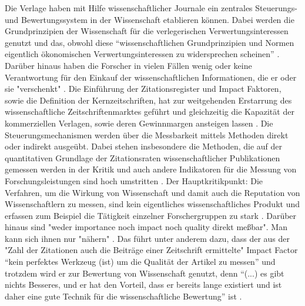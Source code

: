 Die Verlage haben mit Hilfe wissenschaftlicher Journale ein zentrales Steuerungs- und Bewertungssystem in der Wissenschaft etablieren können. Dabei werden die Grundprinzipien der Wissenschaft für die verlegerischen Verwertungsinteressen genutzt und das, obwohl diese “wissenschaftlichen Grundprinzipien und Normen eigentlich ökonomischen Verwertungsinteressen zu widersprechen scheinen” \cite{hanekop_2006}. Darüber hinaus haben die Forscher in vielen Fällen wenig oder keine Verantwortung für den Einkauf der wissenschaftlichen Informationen, die er oder sie "verschenkt" \cite{steele_2006}. Die Einführung der Zitationsregister und Impact Faktoren, sowie die Definition der Kernzeitschriften, hat zur weitgehenden Erstarrung des wissenschaftliche Zeitschriftenmarktes geführt und gleichzeitig die Kapazität der kommerziellen Verlagen, sowie deren Gewinnmargen ansteigen lassen \cite{CREATe_2014}. Die Steuerungsmechanismen werden über die Messbarkeit mittels Methoden direkt oder indirekt ausgeübt. Dabei stehen insbesondere die Methoden, die auf der quantitativen Grundlage der Zitationsraten wissenschaftlicher Publikationen gemessen werden in der Kritik \cite{Dong_2005} und auch andere Indikatoren für die Messung von Forschungsleistungen sind hoch umstritten \cite{Hornbostel_1997} \cite{Hicks_1996} \cite{Havemann_2002}. Der Hauptkritikpunkt: Die Verfahren, um die Wirkung von Wissenschaft und damit auch die Reputation von Wissenschaftlern zu messen, sind kein eigentliches wissenschaftliches Produkt\cite{suchen} und erfassen zum Beispiel die Tätigkeit einzelner Forschergruppen zu stark \cite{schmoch_2009}. Darüber hinaus sind "weder importance noch impact noch quality direkt meßbar". Man kann sich ihnen nur "nähern" \cite{Hornbostel_1997}. Das führt unter anderem dazu, dass der aus der "Zahl der Zitationen auch die Beiträge einer Zeitschrift ermittelte" \cite{weishaupt_2009_goldenOA} Impact Factor “kein perfektes Werkzeug (ist) um die Qualität der Artikel zu messen” und trotzdem wird er zur Bewertung von Wissenschaft genutzt, denn “(...) es gibt nichts Besseres, und er hat den Vorteil, dass er bereits lange existiert und ist daher eine gute Technik für die wissenschaftliche Bewertung” ist \cite{garfield_1999} \cite{weishaupt_2009_goldenOA}.

